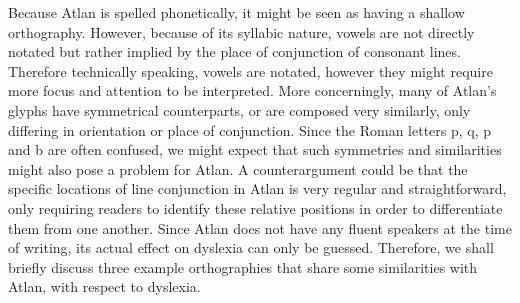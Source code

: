 Because Atlan is spelled phonetically, it might be seen as having a shallow orthography. However, because of its syllabic nature, vowels are not directly notated but rather implied by the place of conjunction of consonant lines. Therefore technically speaking, vowels are notated, however they might require more focus and attention to be interpreted. More concerningly, many of Atlan’s glyphs have symmetrical counterparts, or are composed very similarly, only differing in orientation or place of conjunction. Since the Roman letters p, q, p and b are often confused, we might expect that such symmetries and similarities might also pose a problem for Atlan. A counterargument could be that the specific locations of line conjunction in Atlan is very regular and straightforward, only requiring readers to identify these relative positions in order to differentiate them from one another. Since Atlan does not have any fluent speakers at the time of writing, its actual effect on dyslexia can only be guessed\footnotemark. Therefore, we shall briefly discuss three example orthographies that share some similarities with Atlan, with respect to dyslexia. 


\def\isy#1{\scalerel*{\texttt{[image: ./Images/\#1.jpg]}}{X}}

